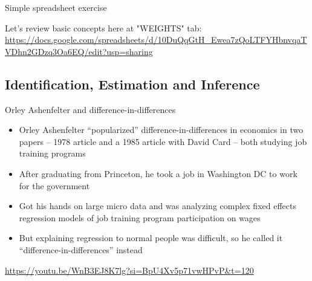 \documentclass{beamer}
\begin{document}
\begin{frame}{Simple spreadsheet exercise}

Let's review basic concepts here at "WEIGHTS" tab: \url{https://docs.google.com/spreadsheets/d/10DuQqGtH_Ewea7zQoLTFYHbnvqaTVDhn2GDzq3Oa6EQ/edit?usp=sharing}

\end{frame}

\subsection{Identification, Estimation and Inference}

\begin{frame}{Orley Ashenfelter and difference-in-differences}

\begin{itemize}
\item Orley Ashenfelter ``popularized'' difference-in-differences in economics in two papers -- 1978 article and a 1985 article with David Card -- both studying job training programs
\item After graduating from Princeton, he took a job in Washington DC to work for the government
\item Got his hands on large micro data and was analyzing complex fixed effects regression models of job training program participation on wages
\item But explaining regression to normal people was difficult, so he called it ``difference-in-differences'' instead
\end{itemize}

\url{https://youtu.be/WnB3EJ8K7lg?si=BpU4Xv5p71vwHPvP&t=120}

\end{frame}
\end{document}
